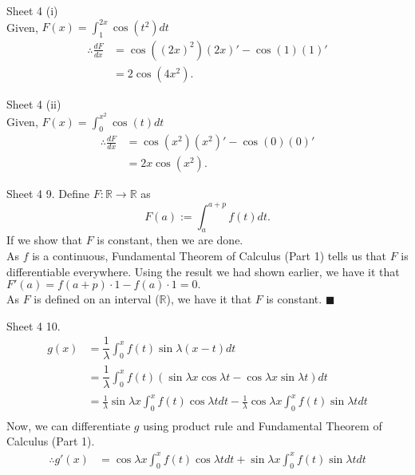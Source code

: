 \documentclass[handout, aspectratio=169]{beamer}
\begin{document}
\begin{frame}{Sheet 4}
	(i)\\
	Given, $F(x) = \displaystyle\int_{1}^{2x} \cos(t^2) dt $
	\begin{align*}
		\therefore \frac{dF}{dx} &= \cos\left((2x)^2\right)(2x)' - \cos(1)(1)' \\
		&= 2\cos(4x^2).
	\end{align*}
\end{frame}
\begin{frame}{Sheet 4}
	(ii)\\
	Given, $F(x) = \displaystyle\int_{0}^{x^2} \cos(t) dt $
	\begin{align*}
		\therefore \frac{dF}{dx} &= \cos\left(x^2\right)(x^2)' - \cos(0)(0)'\\
		& = 2x\cos(x^2).
	\end{align*}
\end{frame}
\begin{frame}{Sheet 4}
	9. Define $F:\mathbb{R} \to \mathbb{R}$ as
	\[F(a) := \int_{a}^{a+p} f(t) dt.\]
	If we show that $F$ is constant, then we are done.\\
	As $f$ is a continuous, Fundamental Theorem of Calculus (Part 1) tells us that $F$ is differentiable everywhere. Using the result we had shown earlier, we have it that $F'(a) = f(a+p)\cdot 1 - f(a)\cdot 1 = 0.$\\
	As $F$ is defined on an interval ($\mathbb{R}$), we have it that $F$ is constant. \hfill $\blacksquare$
\end{frame}
\begin{frame}{Sheet 4}
	10. 
	\begin{align*}
		g(x) &= \dfrac{1}{\lambda}\int_{0}^{x} f(t)\sin \lambda(x - t) dt\\
		&= \dfrac{1}{\lambda}\int_{0}^{x} f(t) \left(\sin \lambda x\cos \lambda t - \cos \lambda x \sin \lambda t\right) dt\\
		&= \frac{1}{\lambda}\sin\lambda x\int_{0}^{x} f(t)\cos \lambda t dt - \frac{1}{\lambda}\cos \lambda x \int_{0}^{x} f(t)\sin \lambda t dt \\
	\end{align*}
	Now, we can differentiate $g$ using product rule and Fundamental Theorem of Calculus (Part 1).
	\begin{align*}
	\therefore g'(x) %
	&= \cos\lambda x\int_{0}^{x} f(t)\cos \lambda t dt + \sin \lambda x \int_{0}^{x} f(t)\sin \lambda t dt \\
	\end{align*}
\end{frame}
		
\end{document}
